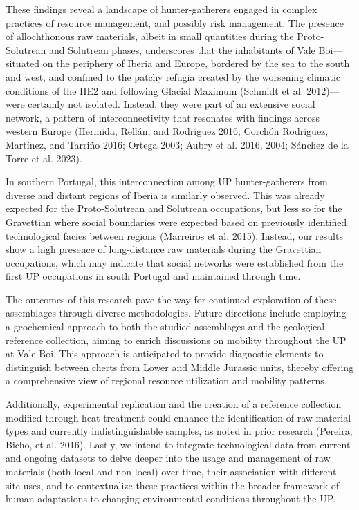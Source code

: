 \documentclass[
  a4paper,
  DIV=11,
  numbers=noendperiod]{scrreprt}
\begin{document}
These findings reveal a landscape of hunter-gatherers engaged in complex
practices of resource management, and possibly risk management. The
presence of allochthonous raw materials, albeit in small quantities
during the Proto-Solutrean and Solutrean phases, underscores that the
inhabitants of Vale Boi---situated on the periphery of Iberia and
Europe, bordered by the sea to the south and west, and confined to the
patchy refugia created by the worsening climatic conditions of the HE2
and following Glacial Maximum (Schmidt et al. 2012)---were certainly not
isolated. Instead, they were part of an extensive social network, a
pattern of interconnectivity that resonates with findings across western
Europe (Hermida, Rellán, and Rodríguez 2016; Corchón Rodríguez,
Martínez, and Tarriño 2016; Ortega 2003; Aubry et al. 2016, 2004;
Sánchez de la Torre et al. 2023).

In southern Portugal, this interconnection among UP hunter-gatherers
from diverse and distant regions of Iberia is similarly observed. This
was already expected for the Proto-Solutrean and Solutrean occupations,
but less so for the Gravettian where social boundaries were expected
based on previously identified technological facies between regions
(Marreiros et al. 2015). Instead, our results show a high presence of
long-distance raw materials during the Gravettian occupations, which may
indicate that social networks were established from the first UP
occupations in south Portugal and maintained through time.

The outcomes of this research pave the way for continued exploration of
these assemblages through diverse methodologies. Future directions
include employing a geochemical approach to both the studied assemblages
and the geological reference collection, aiming to enrich discussions on
mobility throughout the UP at Vale Boi. This approach is anticipated to
provide diagnostic elements to distinguish between cherts from Lower and
Middle Jurassic units, thereby offering a comprehensive view of regional
resource utilization and mobility patterns.

Additionally, experimental replication and the creation of a reference
collection modified through heat treatment could enhance the
identification of raw material types and currently indistinguishable
samples, as noted in prior research (Pereira, Bicho, et al. 2016).
Lastly, we intend to integrate technological data from current and
ongoing datasets to delve deeper into the usage and management of raw
materials (both local and non-local) over time, their association with
different site uses, and to contextualize these practices within the
broader framework of human adaptations to changing environmental
conditions throughout the UP.
\end{document}
